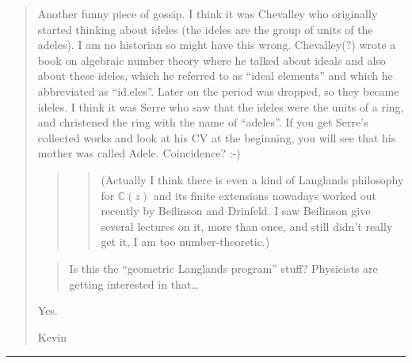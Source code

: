 \documentclass{article}
\begin{document}
\begin{quote}
Another funny piece of gossip. I think it was Chevalley who originally
started thinking about ideles (the ideles are the group of units of the
adeles). I am no historian so might have this wrong. Chevalley(?) wrote
a book on algebraic number theory where he talked about ideals and also
about these ideles, which he referred to as ``ideal elements'' and which
he abbreviated as ``id.eles''. Later on the period was dropped, so they
became ideles. I think it was Serre who saw that the ideles were the
units of a ring, and christened the ring with the name of ``adeles''. If
you get Serre's collected works and look at his CV at the beginning, you
will see that his mother was called Adele. Coincidence? :-)

\begin{quote}
\begin{quote}
(Actually I think there is even a kind of Langlands philosophy for
\(\mathbb{C}(z)\) and its finite extensions nowadays worked out recently
by Beilinson and Drinfeld. I saw Beilinson give several lectures on it,
more than once, and still didn't really get it, I am too
number-theoretic.)
\end{quote}
\end{quote}

\begin{quote}
Is this the ``geometric Langlands program'' stuff? Physicists are
getting interested in that\ldots{}
\end{quote}

Yes.

Kevin
\end{quote}

\begin{center}\rule{0.5\linewidth}{0.5pt}\end{center}
\end{document}
